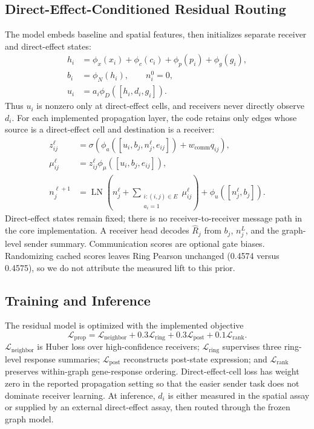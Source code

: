 \subsection{Direct-Effect-Conditioned Residual Routing}
\label{sec:method_residual}
The model embeds baseline and spatial features, then initializes separate
receiver and direct-effect states:
\begin{equation}
\begin{aligned}
h_i&=\phi_x(x_i)+\phi_c(c_i)+\phi_p(p_i)+\phi_g(g_i),\\
b_i&=\phi_N(h_i),\qquad n_i^0=0,\\
u_i&=a_i\phi_D([h_i,d_i,g_i]).
\end{aligned}
\label{eq:state_initialization}
\end{equation}
Thus $u_i$ is nonzero only at direct-effect cells, and receivers never directly
observe $d_i$. For each implemented propagation layer, the code retains only
edges whose source is a direct-effect cell and destination is a receiver:
\begin{equation}
\begin{aligned}
z_{ij}^{\ell}
&=\sigma\!\left(
\phi_a([u_i,b_j,n_j^\ell,e_{ij}])+w_{\mathrm{comm}}q_{ij}
\right),\\
\mu_{ij}^{\ell}
&=z_{ij}^{\ell}\phi_\mu([u_i,b_j,e_{ij}]),\\
n_j^{\ell+1}
&=\operatorname{LN}\!\left(n_j^\ell+
\sum_{\substack{i:(i,j)\in E\\a_i=1}}\mu_{ij}^{\ell}\right)
+\phi_u([n_j^\ell,b_j]).
\end{aligned}
\label{eq:directed_message_passing}
\end{equation}
Direct-effect states remain fixed; there is no receiver-to-receiver message
path in the core implementation. A receiver head decodes $\widehat R_j$ from
$b_j$, $n_j^L$, and the graph-level sender summary. Communication scores are
optional gate biases. Randomizing cached scores leaves Ring Pearson unchanged
(0.4574 versus 0.4575), so we do not attribute the measured lift to this prior.

\subsection{Training and Inference}
\label{sec:training_inference}
The residual model is optimized with the implemented objective
\begin{equation}
\mathcal L_{\mathrm{prop}}
=\mathcal L_{\mathrm{neighbor}}
+0.3\mathcal L_{\mathrm{ring}}
+0.3\mathcal L_{\mathrm{post}}
+0.1\mathcal L_{\mathrm{rank}} .
\label{eq:training_objective}
\end{equation}
$\mathcal L_{\mathrm{neighbor}}$ is Huber loss over high-confidence receivers;
$\mathcal L_{\mathrm{ring}}$ supervises three ring-level response summaries;
$\mathcal L_{\mathrm{post}}$ reconstructs post-state expression; and
$\mathcal L_{\mathrm{rank}}$ preserves within-graph gene-response ordering.
Direct-effect-cell loss has weight zero in the reported propagation setting so
that the easier sender task does not dominate receiver learning. At inference,
$d_i$ is either measured in the spatial assay or supplied by an external
direct-effect assay, then routed through the frozen graph model.

